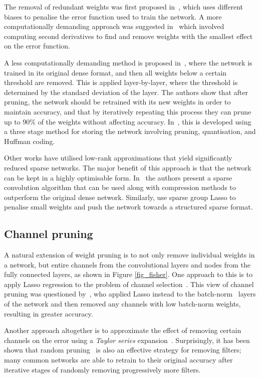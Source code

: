 \documentclass[conference]{IEEEtran}
\begin{document}
The removal of redundant weights was first proposed in~\cite{NIPS1988_156}, which uses different biases to penalise the error function used to train the network. A more computationally demanding approach was suggested in~\cite{lecun1990optimal} which involved computing second derivatives to find and remove weights with the smallest effect on the error function.  

A less computationally demanding method is proposed in~\cite{han2015learning}, where the network is trained in its original dense format, and then all weights below a certain threshold are removed. This is applied layer-by-layer, where the threshold is determined by the standard deviation of the layer. The authors show that after pruning, the network should be retrained with its new weights in order to maintain accuracy, and that by iteratively repeating this process they can prune up to 90\% of the weights without affecting accuracy. In~\cite{han2015deep}, this is developed using a three stage method for storing the network involving pruning, quantisation, and Huffman coding.

Other works \cite{liu2015sparse,denil2013predicting} have utilised low-rank approximations that yield significantly reduced sparse networks. The major benefit of this approach is that the network can be kept in a highly optimisable form. In~\cite{liu2015sparse} the authors present a sparse convolution algorithm that can be used along with compression methods to outperform the original dense network. Similarly, \cite{scardapane2017group,wen2016learning} use sparse group Lasso to penalise small weights and push the network towards a structured sparse format. 

\subsection{Channel pruning}A natural extension of weight pruning is to not only remove individual weights in a network, but entire channels from the convolutional layers and nodes from the fully connected layers, as shown in Figure \ref{fig_fisher}. One approach to this is to apply Lasso regression to the problem of channel selection~\cite{he2017channel}. This view of channel pruning was questioned by~\cite{ye2018rethinking}, who applied Lasso instead to the batch-norm~\cite{ioffe2015batch} layers of the network and then removed any channels with low batch-norm weights, resulting in greater accuracy. 

Another approach altogether is to approximate the effect of removing certain channels on the error using a \emph{Taylor series} expansion~\cite{molchanov2016pruning,theis2018faster}. Surprisingly, it has been shown that random pruning~\cite{mittal2018recovering} is also an effective strategy for removing filters; many common networks are able to retrain to their original accuracy after iterative stages of randomly removing progressively more filters.
\end{document}

